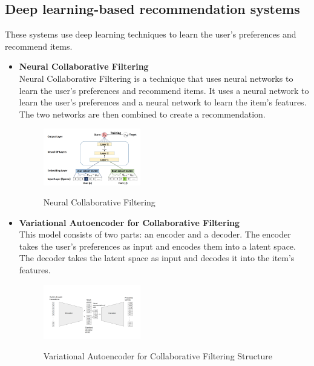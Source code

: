 \subsection{Deep learning-based recommendation systems}\label{subsec:deep-learning-based-recommendation-systems}
These systems use deep learning techniques to learn the user's preferences and recommend items.
\begin{itemize}
    \item \textbf{Neural Collaborative Filtering}\\Neural Collaborative Filtering is a technique that uses neural networks to learn the user's preferences and recommend items. It uses a neural network to learn the user's preferences and a neural network to learn the item's features. The two networks are then combined to create a recommendation.
    \begin{figure}[H]
        \centering
        \includegraphics[width=0.4\textwidth]{assets/neural-collaborative-filtering.png}
        \caption{Neural Collaborative Filtering}
        \label{fig:neural-collaborative-filtering}
        \cite{NvidiaRecSys}
    \end{figure}
    \item \textbf{Variational Autoencoder for Collaborative Filtering}\\This model consists of two parts: an encoder and a decoder. The encoder takes the user's preferences as input and encodes them into a latent space. The decoder takes the latent space as input and decodes it into the item's features.
    \begin{figure}[H]
        \centering
        \includegraphics[width=0.4\textwidth]{assets/variational-autoencoder.png}
        \caption{Variational Autoencoder for Collaborative Filtering Structure}
        \label{fig:variational-autoencoder-for-collaborative-filtering}
        \cite{NvidiaRecSys}

\end{figure}
\end{itemize}
